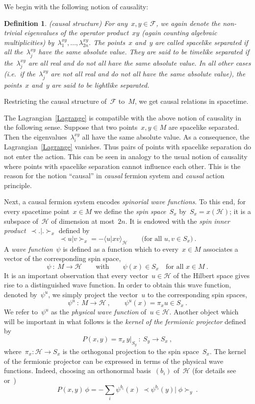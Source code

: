 \documentclass[reqno,11pt]{amsart}
\numberwithin{equation}{section}
\newtheorem{Def}{Definition}[section]
\newcommand{\beq}{\begin{equation}}
\newcommand{\eeq}{\end{equation}}
\newcommand{\la}{\langle}
\newcommand{\ra}{\rangle}
\newcommand{\Sl}{\mathopen{\prec}}
\newcommand{\Sr}{\mathclose{\succ}}
\newcommand{\1}{\mbox{\rm 1 \hspace{-1.05 em} 1}}
\renewcommand{\H}{\mathscr{H}}
\newcommand{\F}{{\mathscr{F}}}
\begin{document}
We begin with the following notion of causality:
\begin{Def} (causal structure) \label{def2} %
{\em{ For any~$x, y \in \F$, we again denote the non-trivial ei\-gen\-values of the operator product~$xy$
(again counting algebraic multiplicities) by~$\lambda^{xy}_1, \ldots, \lambda^{xy}_{2n}$.
The points~$x$ and~$y$ are
called {\em{spacelike}} separated if all the~$\lambda^{xy}_j$ have the same absolute value.
They are said to be {\em{timelike}} separated if the~$\lambda^{xy}_j$ are all real and do not all 
have the same absolute value.
In all other cases (i.e.\ if the~$\lambda^{xy}_j$ are not all real and do not all 
have the same absolute value),
the points~$x$ and~$y$ are said to be {\em{lightlike}} separated. }}
\end{Def} \noindent
Restricting the causal structure of~$\F$ to~$M$, we get causal relations in spacetime.

The Lagrangian~\eqref{Lagrange} is compatible with the above notion of causality in the
following sense.
Suppose that two points~$x, y \in M$ are spacelike separated.
Then the eigenvalues~$\lambda^{xy}_i$ all have the same absolute value.
As a consequence, the Lagrangian~\eqref{Lagrange} vanishes. Thus pairs of points with spacelike
separation do not enter the action. This can be seen in analogy to the usual notion of causality where
points with spacelike separation cannot influence each other.
This is the reason for the notion ``causal'' in {\em{causal}} fermion system
and {\em{causal}} action principle.

Next, a causal fermion system encodes {\em{spinorial wave functions}}.
To this end, for every spacetime point~$x \in M$ we define the {\em{spin space}}~$S_x$ by~$S_x = x(\H)$;
it is a subspace of~$\H$ of dimension at most~$2n$.
It is endowed with the {\em{spin inner product}}~$\Sl .|. \Sr_x$ defined by
\beq \label{ssp}
\Sl u | v \Sr_x = -\la u | x v \ra_\H \qquad \text{(for all~$u,v \in S_x$)}\:.
\eeq
A {\em{wave function}}~$\psi$ is defined as a function
which to every~$x \in M$ associates a vector of the corresponding spin space,
\[ %
\psi \::\: M \rightarrow \H \qquad \text{with} \qquad \psi(x) \in S_x \quad \text{for all~$x \in M$}\:. \]
It is an important observation that every vector~$u \in \H$ of the Hilbert space gives rise to a distinguished
wave function. In order to obtain this wave function, denoted by~$\psi^u$, we simply project the vector~$u$
to the corresponding spin spaces,
\[ %
\psi^u \::\: M \rightarrow \H\:,\qquad \psi^u(x) = \pi_x u \in S_x \:. \]
We refer to~$\psi^u$ as the {\em{physical wave function}} of~$u \in \H$.
Another object which will be important in what follows is the 
{\em{kernel of the fermionic projector}} defined by
\beq \label{Pxyabs}
P(x,y) = \pi_x \,y|_{S_y} \::\: S_y \rightarrow S_x \:,
\eeq
where~$\pi_x : \H \rightarrow S_x$ is the orthogonal projection to the spin space~$S_x$.
The kernel of the fermionic projector can be expressed in terms of the physical wave functions.
Indeed, choosing an orthonormal basis~$(b_i)$ of~$\H$
(for details see~\cite[Chapter~1]{cfs} or~\cite[Section~5.6]{intro})
\beq \label{Pxyphysical}
P(x,y) \, \phi = -\sum_i \psi^{b_i}(x) \: \Sl \psi^{b_i}(y) |\; \phi \Sr_y \:.
\eeq
\end{document}
